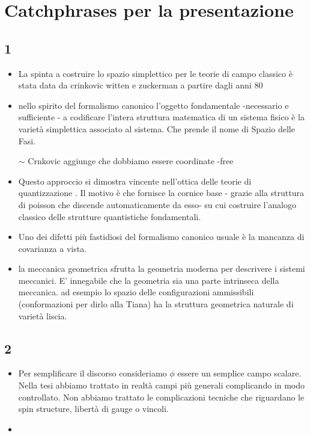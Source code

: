 \documentclass[Main]{subfiles}
\begin{document}
\chapter{Catchphrases per la presentazione}
	\section{1}
	\begin{itemize}
		\item La spinta a costruire lo spazio simplettico per le teorie di campo classico è stata data da crinkovic witten e zuckerman a partire dagli anni 80
		\item nello spirito del formalismo canonico l'oggetto fondamentale  -necessario e sufficiente - a codificare l'intera struttura matematica di un sistema fisico è la varietà simplettica associato al sistema. Che prende il nome di Spazio delle Fasi.
		\item[$\sim$]Crnkovic aggiunge che dobbiamo essere coordinate -free 
		\item Questo approccio si dimostra vincente nell'ottica delle teorie di quantizzazione . Il motivo è che fornisce la cornice base - grazie alla struttura di poisson che discende automaticamente da esso- su cui costruire l'analogo classico delle strutture quantistiche fondamentali.
		\item Uno dei difetti più fastidiosi del formalismo canonico usuale è la mancanza di covarianza a vista.
		\item la meccanica geometrica sfrutta la geometria moderna per descrivere i sistemi meccanici. E' innegabile che la geometria sia una parte intrinseca della meccanica. ad esempio lo spazio delle configurazioni ammissibili (conformazioni per dirlo alla Tiana) ha la struttura geometrica naturale di varietà liscia.
	\end{itemize}		
	
	
	
	\section{2}
	\begin{itemize}
		\item Per semplificare il discorso consideriamo $\phi$ essere un semplice campo scalare. Nella tesi abbiamo trattato in realtà campi più generali complicando in modo controllato. Non abbiamo trattato le complicazioni tecniche che riguardano le spin structure, libertà di gauge o vincoli.
		\item
	\end{itemize}
\end{document}
